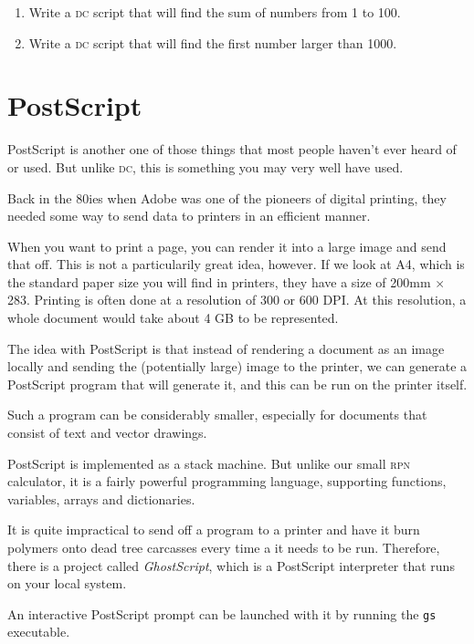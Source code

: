\documentclass[a4paper,twocolumn]{article}
\begin{document}
\begin{enumerate}
  \item Write a \textsc{dc} script that will find the sum of numbers from 1 to 100.
  \item Write a \textsc{dc} script that will find the first number larger than 1000.
\end{enumerate}

\section{PostScript}

PostScript is another one of those things that most people haven't ever heard of or used. But unlike \textsc{dc}, this is something you may very well have used.

Back in the 80ies when Adobe was one of the pioneers of digital printing, they needed some way to send data to printers in an efficient manner.

When you want to print a page, you can render it into a large image and send that off. This is not a particularily great idea, however. If we look at A4, which is the standard paper size you will find in printers, they have a size of 200mm $\times$ 283. Printing is often done at a resolution of 300 or 600 DPI. At this resolution, a whole document would take about 4 GB to be represented.

The idea with PostScript is that instead of rendering a document as an image locally and sending the (potentially large) image to the printer, we can generate a PostScript program that will generate it, and this can be run on the printer itself.

Such a program can be considerably smaller, especially for documents that consist of text and vector drawings.

PostScript is implemented as a stack machine. But unlike our small \textsc{rpn} calculator, it is a fairly powerful programming language, supporting functions, variables, arrays and dictionaries.

It is quite impractical to send off a program to a printer and have it burn polymers onto dead tree carcasses every time a it needs to be run. Therefore, there is a project called \emph{GhostScript}, which is a PostScript interpreter that runs on your local system.

An interactive PostScript prompt can be launched with it by running the \verb|gs| executable.\cite{bluebook1985}
\end{document}
